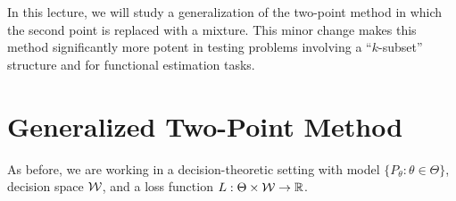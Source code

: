 \documentclass[12pt]{article}
\begin{document}
	\MakeScribeTop

In this lecture, we will study a generalization of the two-point method in which the second point is replaced with a mixture. This minor change makes this method significantly more potent in testing problems involving a ``$k$-subset'' structure and for functional estimation tasks. 

\section{Generalized Two-Point Method}
\label{sec:generalized-two-point-method}
As before, we are working in a decision-theoretic setting with model $\{P_\theta: \theta \in \Theta\}$, decision space ${\cal W}$, and a loss function $L:\Theta \times {\cal W} \to \mathbb{R}$. 
\end{document}
